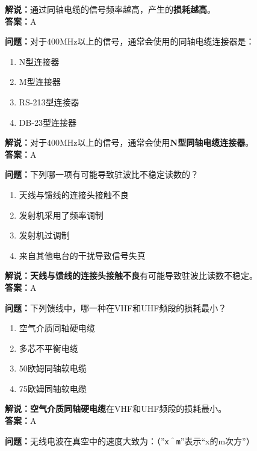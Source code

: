 \textbf{解说：}通过同轴电缆的信号频率越高，产生的\textbf{损耗越高}。\\\textbf{答案：}A%



\textbf{问题：}对于400MHz以上的信号，通常会使用的同轴电缆连接器是：

\begin{enumerate}[label=\Alph*), leftmargin=1cm]
	\item N型连接器
	\item M型连接器
	\item RS-213型连接器
	\item DB-23型连接器
\end{enumerate}

\textbf{解说：}对于400MHz以上的信号，通常会使用\textbf{N型同轴电缆连接器}。\\\textbf{答案：}A%



\textbf{问题：}下列哪一项有可能导致驻波比不稳定读数的？

\begin{enumerate}[label=\Alph*), leftmargin=1cm]
	\item 天线与馈线的连接头接触不良
	\item 发射机采用了频率调制
	\item 发射机过调制
	\item 来自其他电台的干扰导致信号失真
\end{enumerate}

\textbf{解说：}\textbf{天线与馈线的连接头接触不良}有可能导致驻波比读数不稳定。\\\textbf{答案：}A%



\textbf{问题：}下列馈线中，哪一种在VHF和UHF频段的损耗最小？

\begin{enumerate}[label=\Alph*), leftmargin=1cm]
	\item 空气介质同轴硬电缆
	\item 多芯不平衡电缆
	\item 50欧姆同轴软电缆
	\item 75欧姆同轴软电缆
\end{enumerate}

\textbf{解说：}\textbf{空气介质同轴硬电缆}在VHF和UHF频段的损耗最小。\\\textbf{答案：}A%



\textbf{问题：}无线电波在真空中的速度大致为：（”\texttt{x＾m}”表示“x的m次方”）

